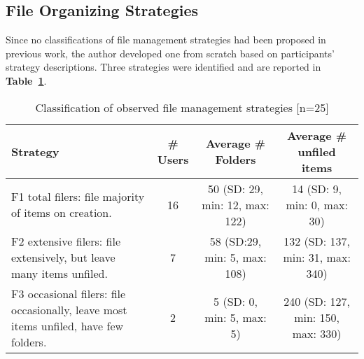 \subsection{File Organizing Strategies}
\label{exp-study:Results-org-strategies-files}

Since no classifications of file management strategies had been proposed in previous work, the author developed one from scratch based on participants' strategy descriptions. Three strategies were identified and are reported in \textbf{Table~\ref{table:exp-study:file_classification}}.

\begin{table}[hbtp]
\begin{center}
\begin{footnotesize}
\setlength{\extrarowheight}{2pt}
\begin{tabular}{|p{4cm}|c|c|c|}
\hline
{\bf Strategy} & {\bf \# Users} & {\bf Average \# Folders} & {\bf Average \# unfiled items} \\
\hline
F1 total filers: file majority of items on creation. &         16 & 50 (SD: 29, min: 12, max: 122)  & 14 (SD: 9, min: 0, max: 30) \\
\hline
F2 extensive filers: file extensively, but leave many items unfiled. &          7 & 58 (SD:29, min: 5, max: 108) & 132 (SD: 137, min:  31, max: 340) \\
\hline
F3 occasional filers: file occasionally, leave most items unfiled, have few folders. &          2 & 5 (SD: 0, min: 5, max: 5) & 240 (SD: 127, min: 150, max: 330) \\
\hline
\end{tabular}  
\end{footnotesize}
\caption{Classification of observed file management strategies [n=25]}
\label{table:exp-study:file_classification}
\end{center}
\end{table}
\normalsize


